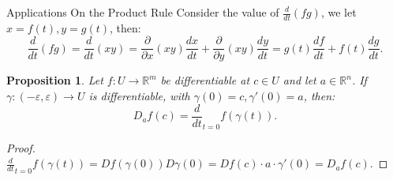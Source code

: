 \documentclass[11pt]{article}
\makeatletter
\newcounter{thmcounter}
\newenvironment{example}[1]{\begin{exbox}{#1}{}}{\end{exbox}}
\theoremstyle{quiet}
\newtheorem{proposition}[thmcounter]{Proposition}
\newtheorem{proposition}[tcb@cnt@defbox]{Proposition}
\theoremstyle{quietremark}
\makeatother
\begin{document}
\begin{example}{Applications On the Product Rule}
Consider the value of $\frac{d}{dt}(fg)$, we let $x=f(t),y=g(t)$, then:
\[
\frac{d}{dt}(fg)=\frac{d}{dt}(xy)=\frac{\partial}{\partial x}(xy)\frac{dx}{dt}+\frac{\partial}{\partial y}(xy)\frac{dy}{dt}=g(t)\frac{df}{dt}+f(t)\frac{dg}{dt}.
\]
\end{example}

\begin{proposition}
Let $f:U\to\mathbb{R}^m$ be differentiable at $c\in U$ and let $a\in\mathbb{R}^n$. If $\gamma:(-\varepsilon,\varepsilon)\to U$ is differentiable, with $\gamma(0)=c,\gamma'(0)=a$, then:
\[
D_af(c)=\frac{d}{dt}_{t=0}f(\gamma(t)).
\]
\end{proposition}

\begin{proof}
$\frac{d}{dt}_{t=0}f(\gamma(t))=Df(\gamma(0))D\gamma(0)=Df(c)\cdot a\cdot\gamma'(0)=D_af(c).$
\end{proof}
\end{document}
